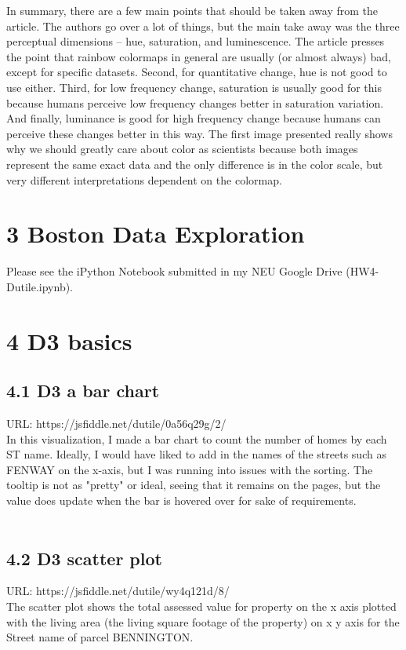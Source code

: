 \documentclass{neu_handout}
\begin{document}
In summary, there are a few main points that should be taken away from the article. The authors go over a lot of things, but the main take away was the three perceptual dimensions – hue, saturation, and luminescence. The article presses the point that rainbow colormaps in general are usually (or almost always) bad, except for specific datasets. Second, for quantitative change, hue is not good to use either. Third, for low frequency change, saturation is usually good for this because humans perceive low frequency changes better in saturation variation. And finally, luminance is good for high frequency change because humans can perceive these changes better in this way. The first image presented really shows why we should greatly care about color as scientists because both images represent the same exact data and the only difference is in the color scale, but very different interpretations dependent on the colormap.

\section*{3 Boston Data Exploration}

Please see the iPython Notebook submitted in my NEU Google Drive (HW4-Dutile.ipynb).

\section*{4 D3 basics}

\subsection*{4.1 D3 a bar chart}

URL: https://jsfiddle.net/dutile/0a56q29g/2/ \\

In this visualization, I made a bar chart to count the number of homes by each ST name. Ideally, I would have liked to add in the names of the streets such as FENWAY on the x-axis, but I was running into issues with the sorting. The tooltip is not as "pretty" or ideal, seeing that it remains on the pages, but the value does update when the bar is hovered over for sake of requirements. \\\\

\subsection*{4.2 D3 scatter plot}

URL: https://jsfiddle.net/dutile/wy4q121d/8/ \\

The scatter plot shows the total assessed value for property on the x axis plotted with the living area (the living square footage of the property) on x y axis for the Street name of parcel BENNINGTON. 
\end{document}

